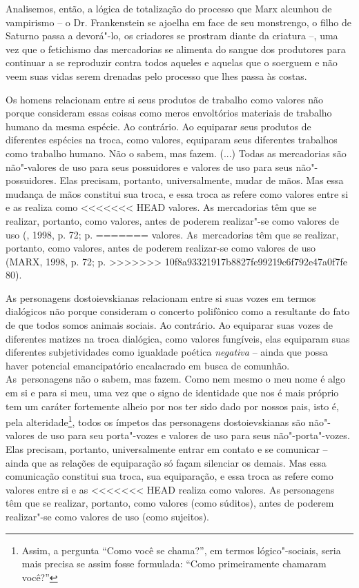 {Analisemos, então, a lógica de totalização do processo que Marx alcunhou
de vampirismo -- o Dr. Frankenstein se ajoelha em face de seu
monstrengo, o filho de Saturno passa a devorá"-lo, os criadores se
prostram diante da criatura --, uma vez que o fetichismo das mercadorias
se alimenta do sangue dos produtores para continuar a se reproduzir
contra todos aqueles e aquelas que o soerguem e não veem suas vidas
serem drenadas pelo processo que lhes passa às costas.

Os homens relacionam entre si seus produtos de trabalho como valores não
porque consideram essas coisas como meros envoltórios materiais de
trabalho humano da mesma espécie. Ao contrário. Ao equiparar seus
produtos de diferentes espécies na troca, como valores, equiparam seus
diferentes trabalhos como trabalho humano. Não o sabem, mas fazem. (...)
Todas as mercadorias são não"-valores de uso para seus possuidores e
valores de uso para seus não"-possuidores. Elas precisam, portanto,
universalmente, mudar de mãos. Mas essa mudança de mãos constitui sua
troca, e essa troca as refere como valores entre si e as realiza como
<<<<<<< HEAD
valores. As mercadorias têm que se realizar, portanto, como valores,
antes de poderem realizar"-se como valores de uso (, 1998, p. 72; p.
=======
valores. As~mercadorias têm que se realizar, portanto, como valores,
antes de poderem realizar-se como valores de uso (MARX, 1998, p. 72; p.
>>>>>>> 10f8a93321917b8827fe99219c6f792e47a0f7fe
80).

As personagens dostoievskianas relacionam entre si suas vozes em termos
dialógicos não porque consideram o concerto polifônico como a resultante
do fato de que todos somos animais sociais. Ao contrário. Ao equiparar
suas vozes de diferentes matizes na troca dialógica, como valores
fungíveis, elas equiparam suas diferentes subjetividades como igualdade
poética \emph{negativa} -- ainda que possa haver potencial emancipatório
encalacrado em busca de comunhão. As~personagens não o sabem, mas fazem.
Como nem mesmo o meu nome é algo em si e para si meu, uma vez que o
signo de identidade que nos é mais próprio tem um caráter fortemente
alheio por nos ter sido dado por nossos pais, isto é, pela
alteridade\footnote{Assim, a pergunta ``Como você se chama?'', em termos
  lógico"-sociais, seria mais precisa se assim fosse formulada: ``Como
  primeiramente chamaram você?''}, todos os ímpetos das personagens
dostoievskianas são não"-valores de uso para seu porta"-vozes e valores de
uso para seus não"-porta"-vozes. Elas precisam, portanto, universalmente
entrar em contato e se comunicar -- ainda que as relações de equiparação
só façam silenciar os demais. Mas essa comunicação constitui sua troca,
sua equiparação, e essa troca as refere como valores entre si e as
<<<<<<< HEAD
realiza como valores. As personagens têm que se realizar, portanto, como
valores (como súditos), antes de poderem realizar"-se como valores de uso
(como sujeitos).

}
